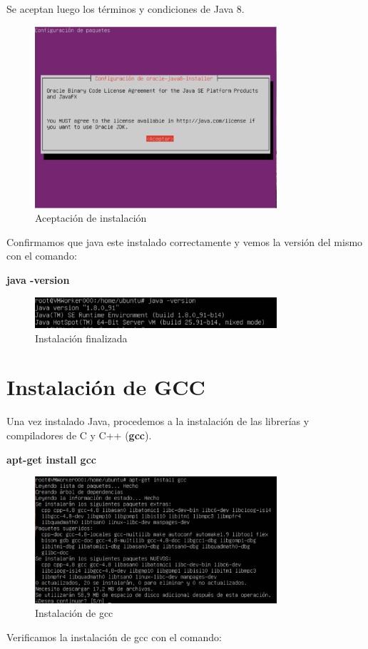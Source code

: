 Se aceptan luego los términos y condiciones de Java 8.

\begin{figure}[h]
\centering
\includegraphics[width=0.8\textwidth]{Figures/javaagree.png}
\decoRule
\caption{Aceptación de instalación}
\label{fig:Java agree}
\end{figure}
\FloatBarrier

Confirmamos que java este instalado correctamente y vemos la versión del mismo con el comando:

\textbf{ java -version}

\begin{figure}[h]
\centering
\includegraphics[width=0.8\textwidth]{Figures/javaversion.png}
\decoRule
\caption{Instalación finalizada}
\label{fig:Java version}
\end{figure}
\FloatBarrier

\section{Instalación de GCC}
Una vez instalado Java, procedemos a la instalación de las librerías y compiladores de C y C++ (\textbf{gcc}).

\textbf{apt-get install gcc}

\begin{figure}[h]
\centering
\includegraphics[width=0.8\textwidth]{Figures/gccinstall.png}
\decoRule
\caption{Instalación de gcc}
\label{fig:GCC install}
\end{figure}
\FloatBarrier
Verificamos la instalación de gcc con el comando:

